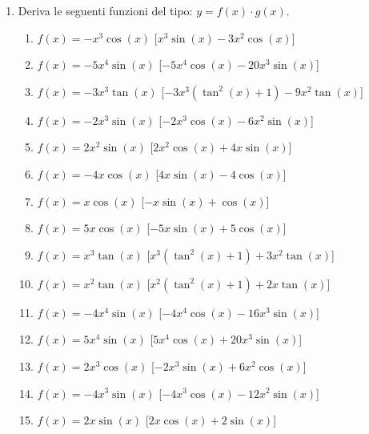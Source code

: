 \begin{enumerate}
\item Deriva le seguenti funzioni del tipo: $y=f(x)\cdot g(x)$.

\begin{enumerate}
\item \(f(x) = - x^{3} \cos{\left (x \right )}\) \hfill [\(x^{3} \sin{\left (x 
\right )} - 3 x^{2} \cos{\left (x \right )}\)]
\item \(f(x) = - 5 x^{4} \sin{\left (x \right )}\) \hfill [\(- 5 x^{4} 
\cos{\left (x \right )} - 20 x^{3} \sin{\left (x \right )}\)]
\item \(f(x) = - 3 x^{3} \tan{\left (x \right )}\) \hfill [\(- 3 x^{3} 
\left(\tan^{2}{\left (x \right )} + 1\right) - 9 x^{2} \tan{\left (x \right 
)}\)]
\item \(f(x) = - 2 x^{3} \sin{\left (x \right )}\) \hfill [\(- 2 x^{3} 
\cos{\left (x \right )} - 6 x^{2} \sin{\left (x \right )}\)]
\item \(f(x) = 2 x^{2} \sin{\left (x \right )}\) \hfill [\(2 x^{2} \cos{\left (x 
\right )} + 4 x \sin{\left (x \right )}\)]
\item \(f(x) = - 4 x \cos{\left (x \right )}\) \hfill [\(4 x \sin{\left (x 
\right )} - 4 \cos{\left (x \right )}\)]
\item \(f(x) = x \cos{\left (x \right )}\) \hfill [\(- x \sin{\left (x \right )} 
+ \cos{\left (x \right )}\)]
\item \(f(x) = 5 x \cos{\left (x \right )}\) \hfill [\(- 5 x \sin{\left (x 
\right )} + 5 \cos{\left (x \right )}\)]
\item \(f(x) = x^{3} \tan{\left (x \right )}\) \hfill [\(x^{3} 
\left(\tan^{2}{\left (x \right )} + 1\right) + 3 x^{2} \tan{\left (x \right 
)}\)]
\item \(f(x) = x^{2} \tan{\left (x \right )}\) \hfill [\(x^{2} 
\left(\tan^{2}{\left (x \right )} + 1\right) + 2 x \tan{\left (x \right )}\)]
\item \(f(x) = - 4 x^{4} \sin{\left (x \right )}\) \hfill [\(- 4 x^{4} 
\cos{\left (x \right )} - 16 x^{3} \sin{\left (x \right )}\)]
\item \(f(x) = 5 x^{4} \sin{\left (x \right )}\) \hfill [\(5 x^{4} \cos{\left (x 
\right )} + 20 x^{3} \sin{\left (x \right )}\)]
\item \(f(x) = 2 x^{3} \cos{\left (x \right )}\) \hfill [\(- 2 x^{3} \sin{\left 
(x \right )} + 6 x^{2} \cos{\left (x \right )}\)]
\item \(f(x) = - 4 x^{3} \sin{\left (x \right )}\) \hfill [\(- 4 x^{3} 
\cos{\left (x \right )} - 12 x^{2} \sin{\left (x \right )}\)]
\item \(f(x) = 2 x \sin{\left (x \right )}\) \hfill [\(2 x \cos{\left (x \right 
)} + 2 \sin{\left (x \right )}\)]
\end{enumerate}



\end{enumerate}

